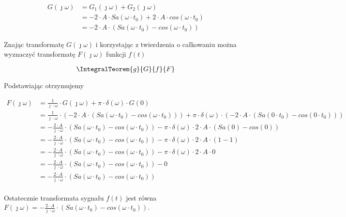 \begin{task}
\begin{align*}
G(\jmath \omega) &= G_1(\jmath \omega)+G_2(\jmath \omega)\\
&= -2\cdot A \cdot Sa\left( \omega \cdot t_0\right) + 2 \cdot A \cdot cos\left( \omega \cdot t_0\right)\\
&= -2\cdot A \cdot \left( Sa\left( \omega \cdot t_0\right) - cos\left( \omega \cdot t_0\right) \right)
\end{align*}

Znając transformatę $G(\jmath \omega)$ i korzystając z twierdzenia o całkowaniu można wyznaczyć transformatę $F(\jmath \omega)$ funkcji $f(t)$

\begin{align*}
\IntegralTeorem{g}{G}{f}{F}
\end{align*}
 
 Podstawiając otrzymujemy
 
\begin{align*}
F(\jmath \omega) &= \frac{1}{\jmath \cdot \omega} \cdot G(\jmath \omega) + \pi \cdot \delta(\omega) \cdot G(0)\\
&=\frac{1}{\jmath \cdot \omega} \cdot \left(-2\cdot A \cdot \left( Sa\left( \omega \cdot t_0\right) - cos\left( \omega \cdot t_0\right) \right)\right) + \pi \cdot \delta(\omega) \cdot \left( -2\cdot A \cdot \left( Sa\left( 0 \cdot t_0\right) - cos\left( 0 \cdot t_0\right) \right) \right)\\
&=-\frac{2\cdot A}{\jmath \cdot \omega} \cdot \left( Sa\left( \omega \cdot t_0\right) - cos\left( \omega \cdot t_0\right) \right) - \pi \cdot \delta(\omega) \cdot 2\cdot A \cdot \left( Sa\left(0\right) - cos\left( 0 \right) \right)\\
&=-\frac{2\cdot A}{\jmath \cdot \omega} \cdot \left( Sa\left( \omega \cdot t_0\right) - cos\left( \omega \cdot t_0\right) \right) - \pi \cdot \delta(\omega) \cdot 2\cdot A \cdot \left( 1 - 1 \right)\\
&=-\frac{2\cdot A}{\jmath \cdot \omega} \cdot \left( Sa\left( \omega \cdot t_0\right) - cos\left( \omega \cdot t_0\right) \right) - \pi \cdot \delta(\omega) \cdot 2\cdot A \cdot 0\\
&=-\frac{2\cdot A}{\jmath \cdot \omega} \cdot \left( Sa\left( \omega \cdot t_0\right) - cos\left( \omega \cdot t_0\right) \right) - 0 \\
&=-\frac{2\cdot A}{\jmath \cdot \omega} \cdot \left( Sa\left( \omega \cdot t_0\right) - cos\left( \omega \cdot t_0\right) \right)\\
\end{align*}


Ostatecznie transformata sygnału $f(t)$ jest równa $F(\jmath \omega)=-\frac{2\cdot A}{\jmath \cdot \omega} \cdot \left( Sa\left( \omega \cdot t_0\right) - cos\left( \omega \cdot t_0\right) \right)$.

\end{task}

